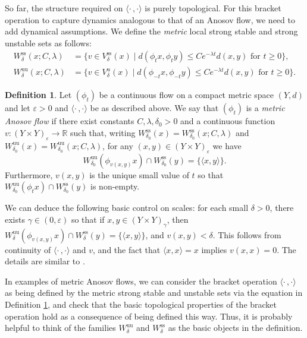 \documentclass[10pt]{amsart}
\let\epsilon\varepsilon
\let\sep\mid
\newcommand{\lrangle}{\langle\cdot\,,\cdot\rangle}
\newcommand{\sts}{\mathrm{ss}}
\newcommand{\uu}{\mathrm{uu}}
\theoremstyle{definition}
\newtheorem{defn}[thm]{Definition}
\numberwithin{equation}{section}
\begin{document}
So far, the structure required on $\lrangle$ is purely topological. For this bracket operation to capture dynamics analogous to that of an Anosov flow, we need to add dynamical assumptions.
We define the \emph{metric} local strong stable and strong unstable sets as follows:
\begin{align*}
W^{\sts}_\delta (x; C, \lambda) &= \{ v \in V^{\sts}_\delta (x) \sep d(\phi_t x, \phi_t y) \leq Ce^{-\lambda t}d(x,y) \text{ for } t \geq 0\},\\
W^{\uu}_\delta (x; C, \lambda) &= \{ v \in V^{u}_\delta (x) \sep d(\phi_{-t} x, \phi_{-t} y) \leq Ce^{-\lambda t}d(x,y) \text{ for } t \geq 0\}.
\end{align*}

\begin{defn}\label{defn:metric anosov}
Let $(\phi_t)$ be a continuous flow on a compact metric space $(Y,d)$ and let $\epsilon>0$ and $\lrangle$ be as described above. We say that $(\phi_t)$ is a \emph{metric Anosov flow} if there exist constants $C, \lambda, \delta_0>0$ and a continuous function $v\colon(Y\times Y)_\epsilon \to \mathbb{R}$ such that, writing $W^{\sts}_{\delta_0} (x) = W^{\sts}_{\delta_0} (x; C, \lambda)$ and $W^{\uu}_{\delta_0} (x) = W^{\uu}_{\delta_0} (x; C, \lambda)$, for any $(x, y) \in (Y \times Y)_\epsilon$ we have
\[ W^{\uu}_{\delta_0}(\phi_{v(x,y)}x) \cap W^{\sts}_{\delta_0}(y) = \{\langle x,y\rangle \}. \]
Furthermore, $v(x,y)$ is the unique small value of $t$ so that $W^{\uu}_{\delta_0}(\phi_{t}x) \cap W^{\sts}_{\delta_0}(y)$ is non-empty.
\end{defn}

We can deduce the following basic control on scales: for each small $\delta>0$, there exists $\gamma\in(0, \epsilon)$ so that if $x,y \in (Y \times Y)_{\gamma}$, then $W^{\uu}_{\delta}(\phi_{v(x,y)}x) \cap W^{\sts}_{\delta}(y) = \{\langle x,y\rangle\}$, and $v(x,y)<\delta$. This follows from continuity of $\lrangle $ and $v$, and the fact that $\langle x,x\rangle =x$ implies $v(x,x)=0$. The details are similar to \cite[Lem.\,1.5]{bowen-periodic}.

In examples of metric Anosov flows, we can consider the bracket operation $\lrangle$ as being defined by the metric strong stable and unstable sets via the equation in Definition \ref{defn:metric anosov}, and check that the basic topological properties of the bracket operation hold as a consequence of being defined this way. Thus, it is probably helpful to think of the families $W^{\uu}_\delta$ and $W^{\sts}_\delta$ as the basic objects in the definition.
\end{document}
